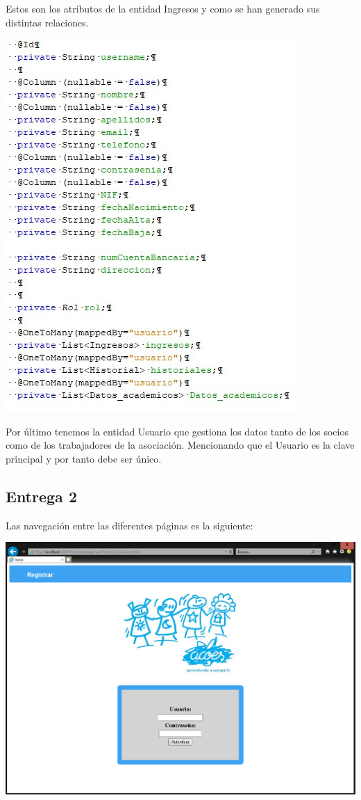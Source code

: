 \documentclass{article}
\begin{document}
Estos son los atributos de la entidad Ingresos y como se han generado sus distintas relaciones.

\begin{center}
\includegraphics[scale=0.5]{images/usuarios.jpg}
\end{center}

Por último tenemos la entidad Usuario que gestiona los datos tanto de los socios como de los trabajadores de la asociación.
Mencionando que el Usuario es la clave principal y por tanto debe ser único.


\subsection{Entrega 2}

Las navegación entre las diferentes páginas es la siguiente:

\begin{center}
\includegraphics[scale=0.5]{capturas/INDEX.PNG}
\end{center}
\end{document}
